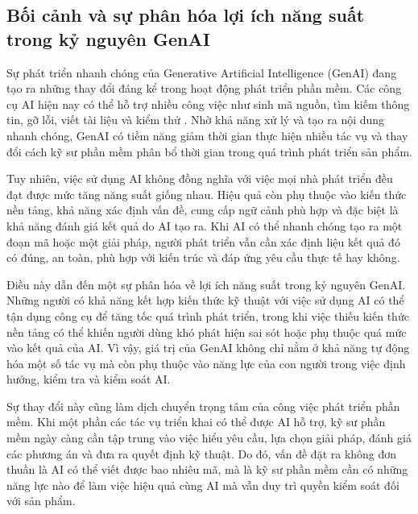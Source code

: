 \subsection{Bối cảnh và sự phân hóa lợi ích năng suất trong kỷ nguyên GenAI}

Sự phát triển nhanh chóng của Generative Artificial Intelligence (GenAI) đang tạo ra những thay đổi đáng kể trong hoạt động phát triển phần mềm. Các công cụ AI hiện nay có thể hỗ trợ nhiều công việc như sinh mã nguồn, tìm kiếm thông tin, gỡ lỗi, viết tài liệu và kiểm thử \cite{stackoverflow2024survey, mckinsey2023unleashing}. Nhờ khả năng xử lý và tạo ra nội dung nhanh chóng, GenAI có tiềm năng giảm thời gian thực hiện nhiều tác vụ và thay đổi cách kỹ sư phần mềm phân bổ thời gian trong quá trình phát triển sản phẩm.

Tuy nhiên, việc sử dụng AI không đồng nghĩa với việc mọi nhà phát triển đều đạt được mức tăng năng suất giống nhau. Hiệu quả còn phụ thuộc vào kiến thức nền tảng, khả năng xác định vấn đề, cung cấp ngữ cảnh phù hợp và đặc biệt là khả năng đánh giá kết quả do AI tạo ra. Khi AI có thể nhanh chóng tạo ra một đoạn mã hoặc một giải pháp, người phát triển vẫn cần xác định liệu kết quả đó có đúng, an toàn, phù hợp với kiến trúc và đáp ứng yêu cầu thực tế hay không.

Điều này dẫn đến một sự phân hóa về lợi ích năng suất trong kỷ nguyên GenAI. Những người có khả năng kết hợp kiến thức kỹ thuật với việc sử dụng AI có thể tận dụng công cụ để tăng tốc quá trình phát triển, trong khi việc thiếu kiến thức nền tảng có thể khiến người dùng khó phát hiện sai sót hoặc phụ thuộc quá mức vào kết quả của AI. Vì vậy, giá trị của GenAI không chỉ nằm ở khả năng tự động hóa một số tác vụ mà còn phụ thuộc vào năng lực của con người trong việc định hướng, kiểm tra và kiểm soát AI.

Sự thay đổi này cũng làm dịch chuyển trọng tâm của công việc phát triển phần mềm. Khi một phần các tác vụ triển khai có thể được AI hỗ trợ, kỹ sư phần mềm ngày càng cần tập trung vào việc hiểu yêu cầu, lựa chọn giải pháp, đánh giá các phương án và đưa ra quyết định kỹ thuật. Do đó, vấn đề đặt ra không đơn thuần là AI có thể viết được bao nhiêu mã, mà là kỹ sư phần mềm cần có những năng lực nào để làm việc hiệu quả cùng AI mà vẫn duy trì quyền kiểm soát đối với sản phẩm.